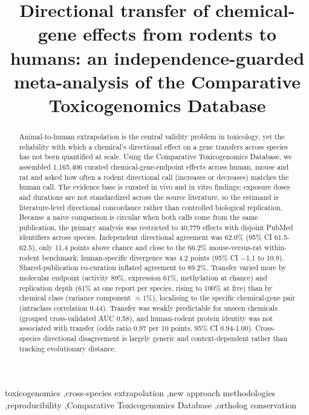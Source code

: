 \documentclass[review,12pt,authoryear]{elsarticle}
\begin{document}
\begin{frontmatter}

\title{Directional transfer of chemical-gene effects from rodents to humans:
an independence-guarded meta-analysis of the Comparative Toxicogenomics
Database}

\author{}

\begin{abstract}
Animal-to-human extrapolation is the central validity problem in toxicology,
yet the reliability with which a chemical's directional effect on a gene
transfers across species has not been quantified at scale. Using the
Comparative Toxicogenomics Database, we assembled 1{,}165{,}406 curated
chemical-gene-endpoint effects across human, mouse and rat and asked how often
a rodent directional call (increases or decreases) matches the human call. The
evidence base is curated in vivo and in vitro findings; exposure doses and
durations are not standardized across the source literature, so the estimand is
literature-level directional concordance rather than controlled biological
replication. Because a naive comparison is circular when both calls come from
the same publication, the primary analysis was restricted to 40{,}779 effects
with disjoint PubMed identifiers across species. Independent directional
agreement was 62.0\% (95\% CI 61.5-62.5), only 11.4 points above chance and
close to the 66.2\% mouse-versus-rat within-rodent benchmark; human-specific
divergence was 4.2 points (95\% CI $-$1.1 to 10.9). Shared-publication
co-curation inflated agreement to 89.2\%. Transfer varied more by molecular
endpoint (activity 89\%, expression 61\%, methylation at chance) and replication
depth (61\% at one report per species, rising to 100\% at five) than by chemical
class (variance component $\approx$1\%), localising to the specific
chemical-gene pair (intraclass correlation 0.44). Transfer was weakly
predictable for unseen chemicals (grouped cross-validated AUC 0.58), and
human-rodent protein identity was not associated with transfer (odds ratio 0.97
per 10 points, 95\% CI 0.94-1.00). Cross-species directional disagreement is
largely generic and context-dependent rather than tracking evolutionary
distance.
\end{abstract}

\begin{keyword}
toxicogenomics \sep cross-species extrapolation \sep new approach methodologies
\sep reproducibility \sep Comparative Toxicogenomics Database \sep ortholog
conservation
\end{keyword}

\end{frontmatter}
\end{document}
